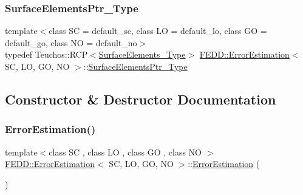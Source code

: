 \mbox{\label{classFEDD_1_1ErrorEstimation_a391a95553efe67657e031e1af4ec02cc}} 
\subsubsection{\texorpdfstring{Surface\+Elements\+Ptr\+\_\+\+Type}{SurfaceElementsPtr\_Type}}
{\footnotesize\ttfamily template$<$class SC  = default\+\_\+sc, class LO  = default\+\_\+lo, class GO  = default\+\_\+go, class NO  = default\+\_\+no$>$ \\
typedef Teuchos\+::\+R\+CP$<$\hyperlink{classFEDD_1_1ErrorEstimation_a0d0800ed536b01a9a4873d0b3508d97a}{Surface\+Elements\+\_\+\+Type}$>$ \hyperlink{classFEDD_1_1ErrorEstimation}{F\+E\+D\+D\+::\+Error\+Estimation}$<$ SC, LO, GO, NO $>$\+::\hyperlink{classFEDD_1_1ErrorEstimation_a391a95553efe67657e031e1af4ec02cc}{Surface\+Elements\+Ptr\+\_\+\+Type}}



\subsection{Constructor \& Destructor Documentation}
\mbox{\label{classFEDD_1_1ErrorEstimation_a0d1a5ec84042b8ff0f7bb1375a4d77bd}} 
\subsubsection{\texorpdfstring{Error\+Estimation()}{ErrorEstimation()}\hspace{0.1cm}{\footnotesize\ttfamily [1/2]}}
{\footnotesize\ttfamily template$<$class SC , class LO , class GO , class NO $>$ \\
\hyperlink{classFEDD_1_1ErrorEstimation}{F\+E\+D\+D\+::\+Error\+Estimation}$<$ SC, LO, GO, NO $>$\+::\hyperlink{classFEDD_1_1ErrorEstimation}{Error\+Estimation} (\begin{DoxyParamCaption}{ }\end{DoxyParamCaption})}

